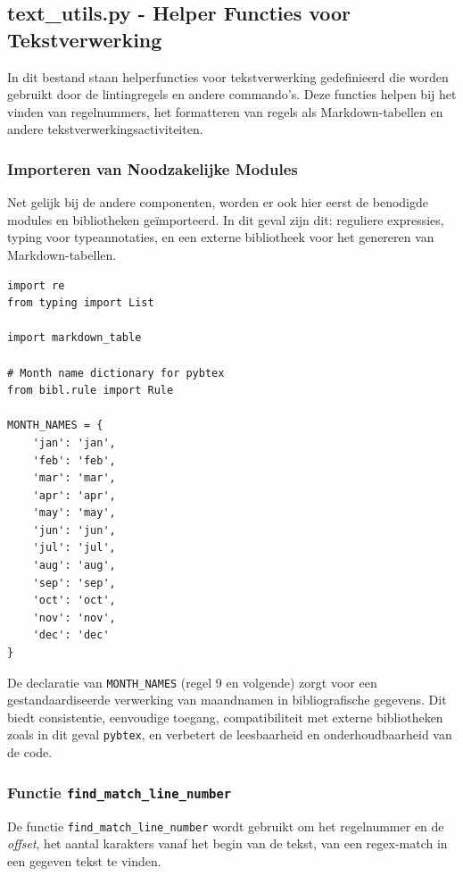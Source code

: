\subsection{text\_utils.py - Helper Functies voor Tekstverwerking}

In dit bestand staan helperfuncties voor tekstverwerking gedefinieerd die worden gebruikt door de lintingregels en andere commando's. Deze functies helpen bij het vinden van regelnummers, het formatteren van regels als Markdown-tabellen en andere tekstverwerkingsactiviteiten.

\subsubsection{Importeren van Noodzakelijke Modules}

Net gelijk bij de andere componenten, worden er ook hier eerst de benodigde modules en bibliotheken geïmporteerd. In dit geval zijn dit: reguliere expressies, typing voor typeannotaties, en een externe bibliotheek voor het genereren van Markdown-tabellen.

\begin{verbatim}
import re
from typing import List

import markdown_table

# Month name dictionary for pybtex
from bibl.rule import Rule

MONTH_NAMES = {
    'jan': 'jan',
    'feb': 'feb',
    'mar': 'mar',
    'apr': 'apr',
    'may': 'may',
    'jun': 'jun',
    'jul': 'jul',
    'aug': 'aug',
    'sep': 'sep',
    'oct': 'oct',
    'nov': 'nov',
    'dec': 'dec'
}
\end{verbatim}

De declaratie van \texttt{MONTH\_NAMES} (regel 9 en volgende) zorgt voor een gestandaardiseerde verwerking van maandnamen in bibliografische gegevens. Dit biedt consistentie, eenvoudige toegang, compatibiliteit met externe bibliotheken zoals in dit geval \texttt{pybtex}, en verbetert de leesbaarheid en onderhoudbaarheid van de code.

\subsubsection{Functie \texttt{find\_match\_line\_number}}

De functie \texttt{find\_match\_line\_number} wordt gebruikt om het regelnummer en de \emph{offset}, het aantal karakters vanaf het begin van de tekst, van een regex-match in een gegeven tekst te vinden.

